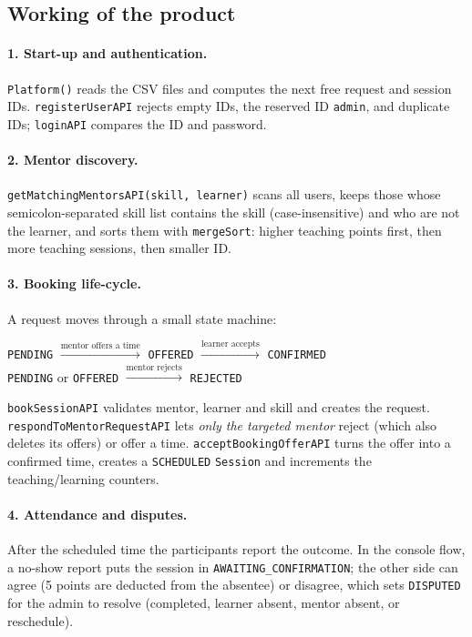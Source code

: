 \documentclass[11pt,a4paper]{article}
\begin{document}
\subsection{Working of the product}

\paragraph{1. Start-up and authentication.} \texttt{Platform()} reads the CSV files and computes the next free request and session IDs. \texttt{registerUserAPI} rejects empty IDs, the reserved ID \texttt{admin}, and duplicate IDs; \texttt{loginAPI} compares the ID and password.

\paragraph{2. Mentor discovery.} \texttt{getMatchingMentorsAPI(skill, learner)} scans all users, keeps those whose semicolon-separated skill list contains the skill (case-insensitive) and who are not the learner, and sorts them with \texttt{mergeSort}: higher teaching points first, then more teaching sessions, then smaller ID.

\paragraph{3. Booking life-cycle.} A request moves through a small state machine:

\begin{center}\small
\texttt{PENDING} $\xrightarrow{\text{mentor offers a time}}$ \texttt{OFFERED} $\xrightarrow{\text{learner accepts}}$ \texttt{CONFIRMED}\\[3pt]
\texttt{PENDING} or \texttt{OFFERED} $\xrightarrow{\text{mentor rejects}}$ \texttt{REJECTED}
\end{center}

\texttt{book\-Session\-API} validates mentor, learner and skill and creates the request. \texttt{respondToMentor\-Request\-API} lets \emph{only the targeted mentor} reject (which also deletes its offers) or offer a time. \texttt{accept\-Booking\-Offer\-API} turns the offer into a confirmed time, creates a \texttt{SCHEDULED} \texttt{Session} and increments the teaching/learning counters.

\paragraph{4. Attendance and disputes.} After the scheduled time the participants report the outcome. In the console flow, a no-show report puts the session in \texttt{AWAITING\_CONFIRMATION}; the other side can agree (5 points are deducted from the absentee) or disagree, which sets \texttt{DISPUTED} for the admin to resolve (completed, learner absent, mentor absent, or reschedule).
\end{document}
